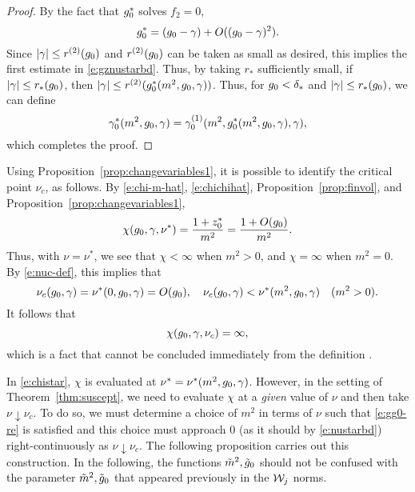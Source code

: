 \begin{proof}
By the fact that $g_0^*$ solves $f_2 = 0$,
\begin{equation}
g_0^* = (g_0 - \gamma) + O((g_0 - \gamma)^2).
\end{equation}
Since $|\gamma| \le r^{(2)}(g_0)$ and $r^{(2)}(g_0)$ can be taken
as small as desired, this implies the first estimate in \eqref{e:gznustarbd}.
Thus, by taking $r_*$ sufficiently small, if $|\gamma| \le r_*(g_0)$, then
$|\gamma| \le r^{(2)}(g_0^*(m^2, g_0, \gamma))$.
Thus, for $g_0 < \delta_*$ and $|\gamma| \leq r_*(g_0)$,
we can define
\begin{equation}
\gamma_0^*(m^2, g_0, \gamma) = \gamma^{(1)}_0(m^2, g_0^*(m^2, g_0, \gamma), \gamma),
\end{equation}
which completes the proof.
\end{proof}

Using Proposition~\ref{prop:changevariables1}, it is possible to
identify the critical point $\nu_c$, as follows.
By \eqref{e:chi-m-hat}, \eqref{e:chichihat}, Proposition~\ref{prop:finvol}, and Proposition~\ref{prop:changevariables1},
\begin{equation}
\label{e:chistar}
\chi(g_0, \gamma, \nu^*) = \frac{1 + z_0^*}{m^2} = \frac{1 + O(g_0)}{m^2}.
\end{equation}
Thus, with $\nu = \nu^*$, we see that $\chi < \infty$ when $m^2 > 0$, and
$\chi = \infty$ when $m^2 = 0$.
By \eqref{e:nuc-def}, this implies that
\begin{equation}
\label{e:nustarbd}
\nu_c(g_0, \gamma) = \nu^*(0, g_0, \gamma) = O(g_0),
	\quad
\nu_c(g_0, \gamma) < \nu^*(m^2, g_0, \gamma)
	\quad
(m^2 > 0).
\end{equation}
It follows that
\begin{equation}
\chi(g_0, \gamma, \nu_c) = \infty,
\end{equation}
which is a fact that cannot be concluded immediately from the definition .

In \eqref{e:chistar}, $\chi$ is evaluated at $\nu^* = \nu^*(m^2, g_0, \gamma)$.
However, in the setting of Theorem~\ref{thm:suscept},
we need to evaluate $\chi$ at a \emph{given} value of $\nu$
and then take $\nu \downarrow \nu_c$.
To do so, we must determine a choice of $m^2$ in terms of $\nu$
such that \eqref{e:gg0-re} is satisfied and this choice
must approach $0$ (as it should by \eqref{e:nustarbd})
right-continuously as $\nu\downarrow\nu_c$.
The following proposition carries out this construction.
In the following, the functions $\tilde m^2, \tilde {g}_0$ should not be
confused with the parameter $\tilde{m}^2, \tilde{g}_0$ that appeared previously
in the $\mathcal{W}_j$ norms.

